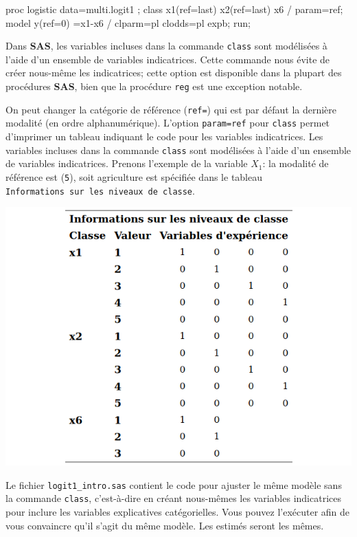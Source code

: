 \documentclass[
  11pt,
  letterpaper,
]{book}
\newenvironment{Shaded}{\begin{snugshade}}{\end{snugshade}}
\newcommand{\NormalTok}[1]{#1}
\theoremstyle{definition}
\theoremstyle{definition}
\theoremstyle{definition}
\theoremstyle{definition}
\theoremstyle{remark}
\begin{document}
\begin{Shaded}
\begin{Highlighting}[]
\NormalTok{proc logistic data=multi.logit1 ;}
\NormalTok{class x1(ref=last) x2(ref=last) x6 / param=ref;}
\NormalTok{model y(ref=\textquotesingle{}0\textquotesingle{}) =x1{-}x6 / clparm=pl clodds=pl expb;}
\NormalTok{run;}
\end{Highlighting}
\end{Shaded}

Dans \textbf{SAS}, les variables incluses dans la commande \texttt{class} sont modélisées à l'aide d'un ensemble de variables indicatrices. Cette commande nous évite de créer nous-même les indicatrices; cette option est disponible dans la plupart des procédures \textbf{SAS}, bien que la procédure \texttt{reg} est une exception notable.

On peut changer la catégorie de référence (\texttt{ref=}) qui est par défaut la dernière modalité (en ordre alphanumérique). L'option \texttt{param=ref} pour \texttt{class} permet d'imprimer un tableau indiquant le code pour les variables indicatrices.
Les variables incluses dans la commande \texttt{class} sont modélisées à l'aide d'un ensemble de variables indicatrices. Prenons l'exemple de la variable \(X_1\): la modalité de référence est (\texttt{5}), soit agriculture est spécifiée dans le tableau \texttt{Informations\ sur\ les\ niveaux\ de\ classe}.

\begin{center}\includegraphics[width=0.75\linewidth]{figures/03-logistic-e9} \end{center}

Le fichier \texttt{logit1\_intro.sas} contient le code pour ajuster le même modèle sans la commande \texttt{class}, c'est-à-dire en créant nous-mêmes les variables indicatrices pour inclure les variables explicatives catégorielles. Vous pouvez l'exécuter afin de vous convaincre qu'il s'agit du même modèle. Les estimés seront les mêmes.
\end{document}

